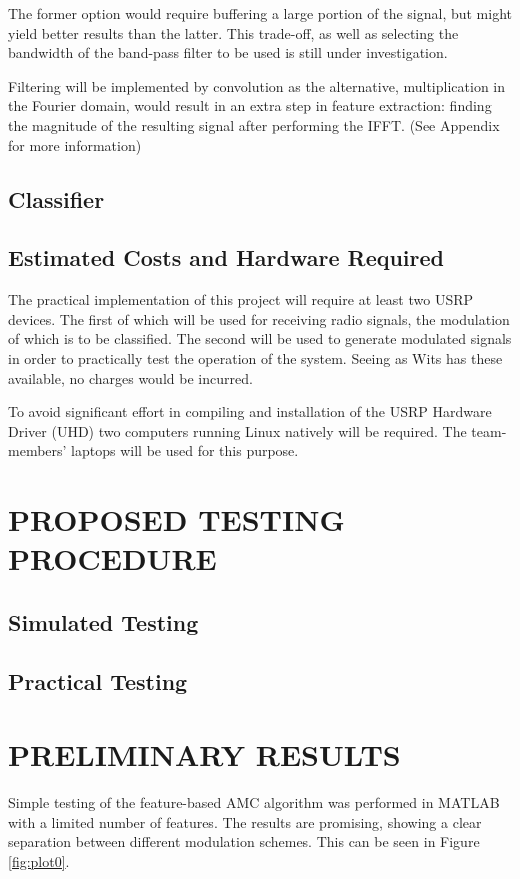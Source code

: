 \documentclass[10pt,twocolumn]{witseiepaper}
\begin{document}
		The former option would require buffering a large portion of the signal, but might yield better results than the latter. This trade-off, as well as selecting the bandwidth of the band-pass filter to be used is still under investigation.

		Filtering will be implemented by convolution as the alternative, multiplication in the Fourier domain, would result in an extra step in feature extraction: finding the magnitude of the resulting signal after performing the IFFT. (See Appendix \cite{app:feature} for more information)

	\subsection{Classifier}

	\subsection{Estimated Costs and Hardware Required}
		The practical implementation of this project will require at least two USRP devices. The first of which will be used for receiving radio signals, the modulation of which is to be classified. The second will be used to generate modulated signals in order to practically test the operation of the system. Seeing as Wits has these available, no charges would be incurred.


		To avoid significant effort in compiling and installation of the USRP Hardware Driver (UHD) two computers running Linux natively will be required. The team-members' laptops will be used for this purpose.

\section{PROPOSED TESTING PROCEDURE}
	\subsection{Simulated Testing}
	\subsection{Practical Testing}

\section{PRELIMINARY RESULTS}
	Simple testing of the feature-based AMC algorithm was performed in MATLAB with a limited number of features. The results are promising, showing a clear separation between different modulation schemes. This can be seen in Figure \ref{fig:plot0}. 
\end{document}
